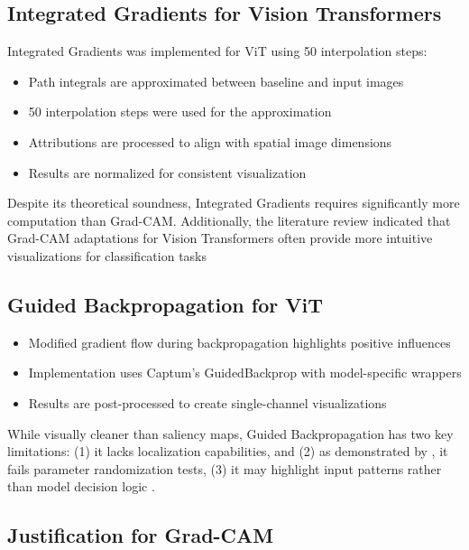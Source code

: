 \documentclass[a4paper,12pt]{report}
\begin{document}
\subsection{Integrated Gradients for Vision Transformers}

Integrated Gradients was implemented for ViT using 50 interpolation steps:

\begin{itemize}
    \item Path integrals are approximated between baseline and input images
    \item 50 interpolation steps were used for the approximation
    \item Attributions are processed to align with spatial image dimensions
    \item Results are normalized for consistent visualization
\end{itemize}

Despite its theoretical soundness, Integrated Gradients requires significantly more computation than Grad-CAM. Additionally, the literature review indicated that Grad-CAM adaptations for Vision Transformers often provide more intuitive visualizations for classification tasks \cite{chefer2021transformer}

\subsection{Guided Backpropagation for ViT}


\begin{itemize}
    \item Modified gradient flow during backpropagation highlights positive influences
    \item Implementation uses Captum's GuidedBackprop with model-specific wrappers
    \item Results are post-processed to create single-channel visualizations
\end{itemize}

While visually cleaner than saliency maps, Guided Backpropagation has two key limitations: (1) it lacks localization capabilities, and (2) as demonstrated by \citep{Adebayo2018}, it fails parameter randomization tests, (3) it may highlight input patterns rather than model decision logic \cite{nie2018theoretical}.

\subsection{Justification for Grad-CAM}
\end{document}
